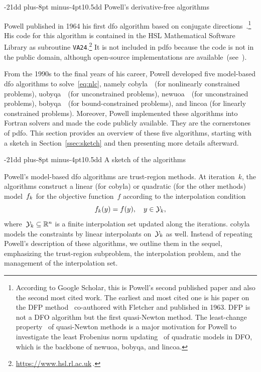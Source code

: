 \documentclass[
    smallextended,  %
    final,          %
]{svjour3}
\makeatletter
\newcommand{\R}{\mathbb{R}}
\newcommand{\objm}[1][k]{\obj\ifthenelse{\equal{#1}{}}{}{_{#1}}}
\newcommand{\obj}{f}
\newcommand{\xpt}[1][k]{\mathcal{Y}\ifthenelse{\equal{#1}{}}{}{_{#1}}}
\def\section{\@startsection{section}{1}{\z@}%
    {-21dd plus-8pt minus-4pt}{10.5dd}
    {\sffamily\normalsize\bfseries\boldmath}}
\def\subsection{\@startsection{subsection}{2}{\z@}%
    {-21dd plus-8pt minus-4pt}{10.5dd}
    {\sffamily\normalsize\bfseries}}
\makeatother
\begin{document}
\section{Powell's derivative-free algorithms}
\label{sec:powell}

Powell published in 1964 his first \gls{dfo} algorithm based on conjugate directions~\cite{Powell_1964}.\footnote{According to Google Scholar, this is Powell's second published paper and also the second most cited work.
The earliest and most cited one is his paper on the DFP method~\cite{Fletcher_Powell_1963} co-authored with Fletcher and published in 1963.
DFP is not a DFO algorithm but the first quasi-Newton method.
The least-change property~\cite{Dennis_Schnabel_1979} of quasi-Newton methods is a major motivation for Powell to investigate the least Frobenius norm updating~\cite{Powell_2004b} of quadratic models in DFO, which is the backbone of \gls{newuoa}, \gls{bobyqa}, and \gls{lincoa}.}
His code for this algorithm is contained in the HSL Mathematical Software Library as subroutine \texttt{VA24}.\footnote{\url{https://www.hsl.rl.ac.uk}\,.}
It is not included in \gls{pdfo} because the code is not in the public domain, although open-source implementations are available~(see~\cite[Footnote~4]{Conn_Scheinberg_Toint_1997b}).

From the 1990s to the final years of his career, Powell developed five model-based \gls{dfo} algorithms to solve~\eqref{eq:nlc}, namely \gls{cobyla}~\cite{Powell_1994}~(for nonlinearly constrained problems), \gls{uobyqa}~\cite{Powell_2002}~(for unconstrained problems), \gls{newuoa}~\cite{Powell_2006}~(for unconstrained problems), \gls{bobyqa}~\cite{Powell_2009}~(for bound-constrained problems), and \gls{lincoa} (for linearly constrained problems).
Moreover, Powell implemented these algorithms into Fortran solvers and made the code publicly available.
They are the cornerstones of \gls{pdfo}.
This section provides an overview of these five algorithms, starting with a sketch in Section~\ref{ssec:sketch} and then presenting more details afterward.

\subsection{A sketch of the algorithms}
\label{ssec:sketch}

Powell's model-based \gls{dfo} algorithms are trust-region methods.
At iteration~$k$, the algorithms construct a linear (for \gls{cobyla}) or quadratic (for the other methods) model~$\objm$ for the objective function~$f$ according to the interpolation condition
\begin{equation}
    \label{eq:itpls}
    \objm(y) = \obj(y), \quad y \in \xpt,
\end{equation}
where~$\xpt \subseteq \R^n$ is a finite interpolation set updated along the iterations.
\Gls{cobyla} models the constraints by linear interpolants on~$\xpt$ as well.
Instead of repeating Powell's description of these algorithms, we outline them in the sequel, emphasizing the trust-region subproblem, the interpolation problem, and the management of the interpolation set.
\end{document}
